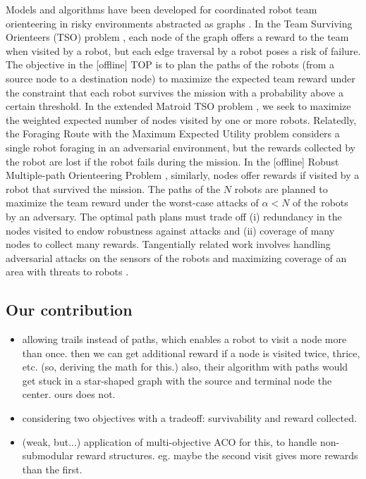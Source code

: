 \documentclass[11pt, oneside]{article}
\begin{document}
Models and algorithms have been developed for coordinated robot team orienteering in risky environments abstracted as graphs \cite{zhou2021multi}. 
In the Team Surviving Orienteers (TSO) problem \cite{jorgensen2018team}, each node of the graph offers a reward to the team when visited by a robot, but each edge traversal by a robot poses a risk of failure. The objective in the [offline] TOP is to plan the paths of the robots (from a source node to a destination node) to maximize the expected team reward under the constraint that each robot survives the mission with a probability above a certain threshold. 
In the extended Matroid TSO problem \cite{jorgensen2017matroid,jorgensen2024matroid}, we seek to maximize the weighted
expected number of nodes visited by one or more robots.
Relatedly, the Foraging Route with the Maximum Expected Utility problem \cite{di2022foraging} considers a single robot foraging in an adversarial environment, but the rewards collected by the robot are lost if the robot fails during the mission.
In the [offline] Robust Multiple-path Orienteering Problem \cite{shi2023robust}, similarly, nodes offer rewards if visited by a robot that survived the mission. The paths of the $N$ robots are planned to maximize the team reward under the worst-case attacks of $\alpha<N$ of the robots by an adversary. 
The optimal path plans must trade off (i) redundancy in the nodes visited to endow robustness against attacks and (ii) coverage of many nodes to collect many rewards.
Tangentially related work involves handling adversarial attacks on the sensors of the robots \cite{liu2021distributed,zhou2022distributed} and maximizing coverage of an area with threats to robots \cite{korngut2023multi,yehoshua2016robotic}.

\subsection{Our contribution}
\begin{itemize}
    \item allowing trails instead of paths, which enables a robot to visit a node more than once. then we can get additional reward if a node is visited twice, thrice, etc. (so, deriving the math for this.) also, their algorithm with paths would get stuck in a star-shaped graph with the source and terminal node the center. ours does not.
   \item considering two objectives with a tradeoff: survivability and reward collected.
   \item  (weak, but...) application of multi-objective ACO for this, to handle non-submodular reward structures. eg. maybe the second visit gives more rewards than the first.
\end{itemize}
\end{document}
